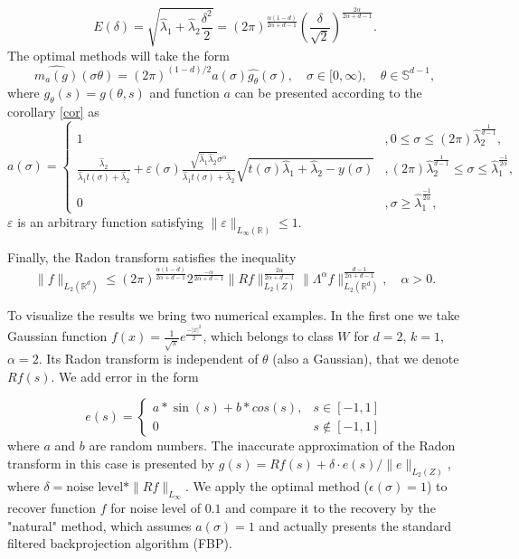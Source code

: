 \documentclass[12pt]{iopart}
\begin{document}
	$$
	E(\delta)=\sqrt{\widehat\lambda_1+\widehat\lambda_2\frac{\delta^2}{2}}=(2\pi)^{\frac{\alpha(1-d)}{2\alpha+d-1}}\left(\frac{\delta}{\sqrt{2}}\right)^{\frac{2\alpha}{2\alpha+d-1}}.
	$$
	The optimal methods will take the form 
	$$
	\widehat{m_a(g)}(\sigma\theta)=(2\pi)^{(1-d)/2}a(\sigma)\widehat{g_\theta }(\sigma),\quad \sigma\in[0,\infty),\quad \theta\in\mathbb S^{d-1},
	$$
	where $g_{\theta}(s)=g(\theta,s)$ and function $a$ can be presented according to the corollary \ref{cor} as
	$$
	a(\sigma)=
	\begin{cases}
	1& ,0\leqslant\sigma\leqslant (2\pi)\widehat\lambda_2^\frac{1}{d-1},\\
	\frac{\widehat\lambda_2}{\widehat\lambda_1t(\sigma)+\widehat\lambda_2}+\varepsilon(\sigma)\frac{\sqrt{\widehat\lambda_1\widehat\lambda_2}\sigma^\alpha}{\widehat\lambda_1t(\sigma)+\widehat\lambda_2}\sqrt{t(\sigma)\widehat\lambda_1+\widehat\lambda_2-y(\sigma)}& ,(2\pi)\widehat\lambda_2^\frac{1}{d-1} \leqslant\sigma\leqslant\widehat\lambda_1^{\frac{-1}{2\alpha}},\\
	0 &,\sigma\geqslant\widehat\lambda_1^{\frac{-1}{2\alpha}},
	\end{cases}
	$$
	$\varepsilon$ is an arbitrary function satisfying $\|\varepsilon\|_{L_\infty(\mathbb R)}\leqslant 1$.
	
	Finally, the Radon transform satisfies the inequality
	$$
	\|f\|_{L_2(\mathbb R^d)}\leqslant
	(2\pi)^{\frac{\alpha(1-d)}{2\alpha+d-1}}2^{\frac{-\alpha}{2\alpha+d-1}}\|Rf\|_{L_2(Z)}^{\frac{2\alpha}{2\alpha+d-1}}\|\Lambda^\alpha f\|_{L_2(\mathbb
		R^d)}^\frac{d-1}{2\alpha+d-1},\quad \alpha>0.
	$$
	
	To visualize the results we bring two numerical examples. In the first one we take Gaussian function $f(x)=\frac{1}{\sqrt{\pi}}e^\frac{-|x|^2}{2}$, which belongs to class $W$ for $d=2$, $k=1$, $\alpha = 2$. Its Radon transform is independent of $\theta$ (also a Gaussian), that we denote $Rf(s)$. We add error in the form 
	
	$$e(s) = \begin{cases}
	a*\sin(s)+b*cos(s), & s\in[-1,1] \\
	0 & s\notin[-1,1]
	\end{cases}
	$$
	where $a$ and $b$ are random numbers. The inaccurate approximation of the Radon transform in this case is presented by $g(s)=Rf(s)+\delta \cdot e(s)/\|e\|_{L_2(Z)}$, where $\delta=\mbox{noise level}*\|Rf\|_{L_\infty}$. We apply the optimal method ($\epsilon(\sigma) = 1$) to recover function $f$ for noise level of $0.1$ and compare it to the recovery by the "natural" method, which assumes $a(\sigma)=1$ and actually presents the standard filtered backprojection algorithm (FBP).
	
\end{document}
